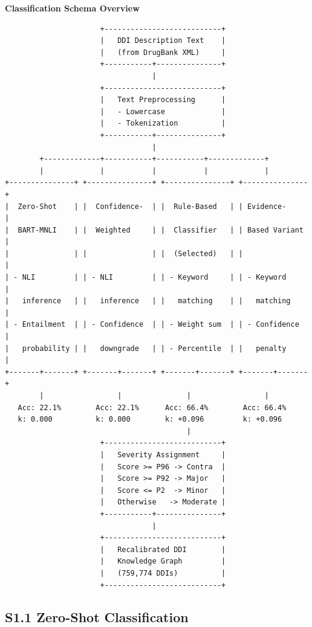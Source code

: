 \documentclass[12pt,a4paper]{article}
\begin{document}
\noindent\textbf{Classification Schema Overview}

\begin{verbatim}
                      +---------------------------+
                      |   DDI Description Text    |
                      |   (from DrugBank XML)     |
                      +-----------+---------------+
                                  |
                      +---------------------------+
                      |   Text Preprocessing      |
                      |   - Lowercase             |
                      |   - Tokenization          |
                      +-----------+---------------+
                                  |
        +-------------+-----------+-----------+-------------+
        |             |           |           |             |
+---------------+ +---------------+ +---------------+ +---------------+
|  Zero-Shot    | |  Confidence-  | |  Rule-Based   | | Evidence-     |
|  BART-MNLI    | |  Weighted     | |  Classifier   | | Based Variant |
|               | |               | |  (Selected)   | |               |
| - NLI         | | - NLI         | | - Keyword     | | - Keyword     |
|   inference   | |   inference   | |   matching    | |   matching    |
| - Entailment  | | - Confidence  | | - Weight sum  | | - Confidence  |
|   probability | |   downgrade   | | - Percentile  | |   penalty     |
+-------+-------+ +-------+-------+ +-------+-------+ +-------+-------+
        |                 |               |                 |
   Acc: 22.1%        Acc: 22.1%      Acc: 66.4%        Acc: 66.4%
   k: 0.000          k: 0.000        k: +0.096         k: +0.096
                                          |
                      +---------------------------+
                      |   Severity Assignment     |
                      |   Score >= P96 -> Contra  |
                      |   Score >= P92 -> Major   |
                      |   Score <= P2  -> Minor   |
                      |   Otherwise   -> Moderate |
                      +-----------+---------------+
                                  |
                      +---------------------------+
                      |   Recalibrated DDI        |
                      |   Knowledge Graph         |
                      |   (759,774 DDIs)          |
                      +---------------------------+
\end{verbatim}

\subsection{S1.1 Zero-Shot Classification}
\end{document}
